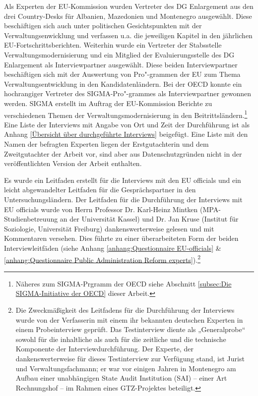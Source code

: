 Als Experten der EU-Kommission wurden Vertreter des DG Enlargement aus den drei Country-Desks für Albanien, Mazedonien und Montenegro ausgewählt. Diese beschäftigen sich auch unter politischen Gesichtspunkten mit der Verwaltungsenwicklung und verfassen u.a. die jeweiligen Kapitel in den jährlichen EU-Fortschrittsberichten. Weiterhin wurde ein Vertreter der Stabsstelle Verwaltungsmodernisierung und ein Mitglied der Evaluierungsstelle des DG Enlargement als Interviewpartner ausgewählt. Diese beiden Interviewpartner beschäftigen sich mit der Auswertung von Pro"-grammen der EU zum Thema Verwaltungsentwicklung in den Kandidatenländern. Bei der OECD konnte ein hochrangiger Vertreter des SIGMA-Pro"-grammes als Interviewpartner gewonnen werden. SIGMA erstellt im Auftrag der EU-Kommission Berichte zu verschiedenen Themen der Verwaltungsmodernisierung in den Beitrittsländern.\footnote{Näheres zum SIGMA-Prgramm der OECD siehe Abschnitt \ref{subsec:Die SIGMA-Initiative der OECD} dieser Arbeit.} Eine Liste der Interviews mit Angabe von Ort und Zeit der Durchführung ist als Anhang \ref{Übersicht über durchgeführte Interviews} beigefügt. Eine Liste mit den Namen der befragten Experten liegen der Erstgutachterin und dem Zweitgutachter der Arbeit vor, sind aber aus Datenschutzgründen nicht in der veröffentlichten Version der Arbeit enthalten.\par
Es wurde ein Leitfaden erstellt für die Interviews mit den EU officials und ein leicht abgewandelter Leitfaden für die Gesprächspartner in den Untersuchungsländern. Der Leitfaden für die Durchführung der Interviews mit EU officials wurde von Herrn Professor Dr. Karl-Heinz Mintken (MPA-Studienbetreuung an der Universität Kassel) und Dr. Jan Kruse (Institut für Soziologie, Universität Freiburg) dankenswerterweise gelesen und mit Kommentaren versehen. Dies führte zu einer überarbeiteten Form der beiden Interviewleitfäden (siehe Anhang \ref{anhang:Questionnaire EU-officials} \& \ref{anhang:Questionnaire Public Administration Reform experts}).\footnote{Die Zweckmäßigkeit des Leitfadens für die Durchführung der Interviews wurde von der Verfasserin mit einem ihr bekannten deutschen Experten in einem Probeinterview geprüft. Das Testinterview diente als „Generalprobe“ sowohl für die inhaltliche als auch für die zeitliche und die technische Komponente der Interviewdurchführung. Der Experte, der dankenswerterweise für dieses Testinterview zur Verfügung stand, ist Jurist und Verwaltungsfachmann; er war vor einigen Jahren in Montenegro am Aufbau einer unabhängigen State Audit Institution (SAI) – einer Art Rechnungshof – im Rahmen eines GTZ-Projektes beteiligt. }

